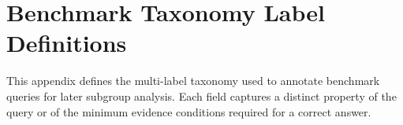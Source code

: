 \chapter{Benchmark Taxonomy Label Definitions}
\label{app:benchmark-taxonomy-labels}

This appendix defines the multi-label taxonomy used to annotate benchmark queries for later subgroup analysis. Each field captures a distinct property of the query or of the minimum evidence conditions required for a correct answer. 

\newcommand{\topcode}[1]{\parbox[t]{\linewidth}{\raggedright\ttfamily #1}}
\newcommand{\toptext}[1]{\parbox[t]{\linewidth}{\raggedright #1}}

\begingroup
\footnotesize
\setlength{\tabcolsep}{4pt}
\renewcommand{\arraystretch}{1.15}

